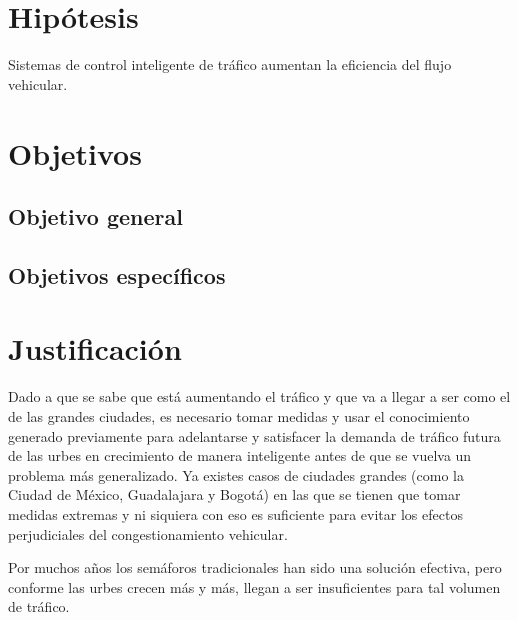 \hypertarget{hipuxf3tesis}{%
\section{Hipótesis}\label{hipuxf3tesis}}

Sistemas de control inteligente de tráfico aumentan la eficiencia del
flujo vehicular.

\hypertarget{objetivos}{%
\section{Objetivos}\label{objetivos}}

\hypertarget{objetivo-general}{%
\subsection{Objetivo general}\label{objetivo-general}}

\hypertarget{objetivos-especuxedficos}{%
\subsection{Objetivos específicos}\label{objetivos-especuxedficos}}

\hypertarget{justificaciuxf3n}{%
\section{Justificación}\label{justificaciuxf3n}}

Dado a que se sabe que está aumentando el tráfico y que va a llegar a
ser como el de las grandes ciudades, es necesario tomar medidas y usar
el conocimiento generado previamente para adelantarse y satisfacer la
demanda de tráfico futura de las urbes en crecimiento de manera
inteligente antes de que se vuelva un problema más generalizado. Ya
existes casos de ciudades grandes (como la Ciudad de México, Guadalajara
y Bogotá) en las que se tienen que tomar medidas extremas y ni siquiera
con eso es suficiente para evitar los efectos perjudiciales del
congestionamiento vehicular.

Por muchos años los semáforos tradicionales han sido una solución
efectiva, pero conforme las urbes crecen más y más, llegan a ser
insuficientes para tal volumen de tráfico.

\clearpage %

